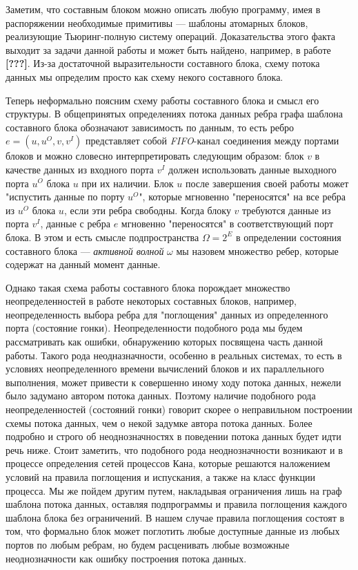 \documentclass[10pt,a4paper]{article}
\begin{document}
Заметим, что составным блоком можно описать любую программу, имея в распоряжении необходимые примитивы --- шаблоны атомарных блоков,
реализующие Тьюринг-полную систему операций. Доказательства этого факта выходит за задачи данной работы и может быть найдено, например, в работе \textbf{[???]}.
Из-за достаточной выразительности составного блока, схему потока данных мы определим просто как схему некого составного блока.

Теперь неформально поясним схему работы составного блока и смысл его структуры.
В общепринятых определениях потока данных ребра графа шаблона составного блока обозначают зависимость по данным, то есть ребро $e = (u, u^O, v, v^I)$ представляет собой
\textit{FIFO}-канал соединения между портами блоков и
можно словесно интерпретировать следующим образом: блок $v$ в качестве данных из входного порта $v^I$ должен использовать данные выходного порта $u^O$ блока $u$ при их наличии.
Блок $u$ после завершения своей работы может "испустить данные по порту $u^O$", которые мгновенно "переносятся" на все ребра из $u^O$ блока $u$,
если эти ребра свободны.
Когда блоку $v$ требуются данные из порта $v^I$, данные с ребра $e$ мгновенно "переносятся" в соответствующий порт блока. В этом и есть смысле подпространства $\Omega = 2^E$
в определении состояния составного блока --- \textit{активной волной} $\omega$ мы назовем множество ребер, которые содержат на данный момент данные.

Однако такая схема работы составного блока порождает множество неопределенностей в работе некоторых составных блоков, например, неопределенность выбора ребра для "поглощения" данных из определенного порта (состояние гонки).
Неопределенности подобного рода мы будем рассматривать как ошибки, обнаружению которых посвящена часть данной работы. Такого рода неодназначности, особенно в реальных системах,
то есть в условиях неопределенного времени вычислений блоков и их параллельного выполнения, может привести к совершенно иному ходу потока данных, нежели было задумано автором потока данных.
Поэтому наличие подобного рода неопределенностей (состояний гонки) говорит скорее о неправильном построении схемы потока данных, чем о некой задумке автора потока данных.
Более подробно и строго об неоднозначностях в поведении потока данных будет идти речь ниже.
Стоит заметить, что подобного рода неоднозначности возникают и в процессе определения сетей процессов Кана,
которые решаются наложением условий на правила поглощения и испускания, а также на класс функции процесса.
Мы же пойдем другим путем, накладывая ограничения лишь на граф шаблона потока данных, оставляя подпрограммы и правила поглощения каждого шаблона блока без ограничений.
В нашем случае правила поглощения состоят в том, что формально блок может поглотить любые доступные данные из любых портов по любым ребрам,
но будем расценивать любые возможные неоднозначности как ошибку построения потока данных.
\end{document}
